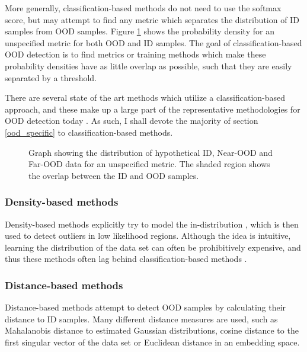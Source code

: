 \documentclass[UKenglish]{uiomasterthesis} %
\theoremstyle{definition}
\begin{document}
More generally, classification-based methods do not need to use the softmax score, but may attempt to find any metric which separates the distribution of ID samples from OOD samples. Figure \ref{fig:ood_metric} shows the probability density for an unspecified metric for both OOD and ID samples. The goal of classification-based OOD detection is to find metrics or training methods which make these probability densities have as little overlap as possible, such that they are easily separated by a threshold.

There are several state of the art methods which utilize a classification-based approach, and these make up a large part of the representative methodologies for OOD detection today \cite[8]{oodoverview}. As such, I shall devote the majority of section \ref{ood_specific} to classification-based methods.

\begin{figure}
    \label{fig:ood_metric}
    \begin{center}
        
    \end{center}
    \caption[Hypothetical ID/OOD distributions for an OOD detection metric]{Graph showing the distribution of hypothetical ID, Near-OOD and Far-OOD data for an unspecified metric. The shaded region shows the overlap between the ID and OOD samples.}
\end{figure}


\subsubsection{Density-based methods}

Density-based methods explicitly try to model the in-distribution \cite{oodoverview}, which is then used to detect outliers in low likelihood regions. Although the idea is intuitive, learning the distribution of the data set can often be prohibitively expensive, and thus these methods often lag behind classification-based methods \cite{oodoverview}.
\\

\subsubsection{Distance-based methods} \label{section:distancebasedood}

Distance-based methods attempt to detect OOD samples by calculating their distance to ID samples. Many different distance measures are used, such as Mahalanobis distance to estimated Gaussian distributions, cosine distance to the first singular vector of the data set or Euclidean distance in an embedding space.
\\
\end{document}
